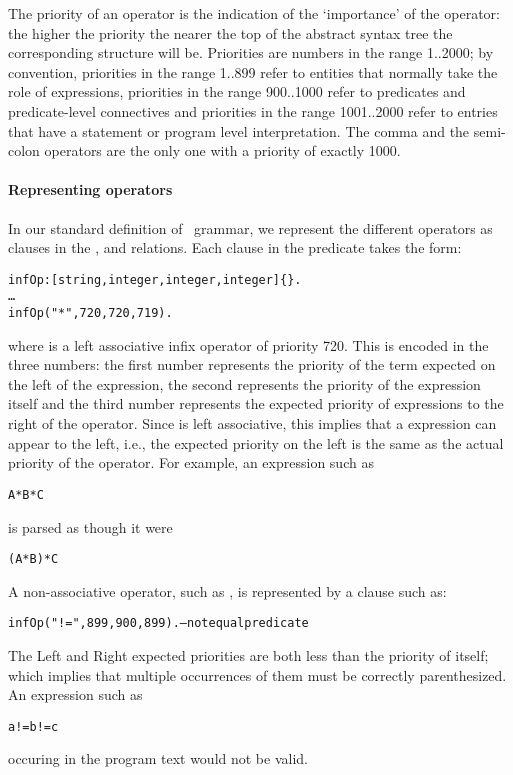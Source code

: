 The priority of an operator is the indication of the `importance' of the operator: the higher the priority the nearer the top of the abstract syntax tree the corresponding structure will be. Priorities are numbers in the range 1..2000; by convention, priorities in the range 1..899 refer to entities that normally take the role of expressions, priorities in the range 900..1000 refer to predicates and predicate-level connectives and priorities in the range 1001..2000 refer to entries that have a statement or program level interpretation. The comma and the semi-colon operators are the only one with a priority of exactly 1000.



\paragraph{Representing operators}
In our standard definition of \go\ grammar, we represent the different operators as clauses in the ,  and  relations. Each clause in the  predicate takes the form:
\begin{alltt}
infOp:[string,integer,integer,integer]\{\}.
\ldots
infOp("*",720,720,719).
\end{alltt}
where  is a left associative infix operator of priority 720. This is encoded in the three numbers: the first number represents the priority of the term expected on the left of the \function{*} expression, the second represents the priority of the \function{*} expression itself and the third number represents the expected priority of expressions to the right of the \function{*} operator. Since \function{*} is left associative, this implies that a \function{*} expression can appear to the left, i.e., the expected priority on the left is the same as the actual priority of the \function{*} operator. For example, an expression such as 
\begin{alltt}
A*B*C
\end{alltt}
is parsed as though it were
\begin{alltt}
(A*B)*C
\end{alltt}

A non-associative operator, such as \function{!=}, is represented by a clause such as:
\begin{alltt}
infOp("!=",899,900,899).		-- not equal predicate
\end{alltt}
The Left and Right expected priorities are both less than the priority of \function{!=} itself; which implies that multiple occurrences of them must be correctly parenthesized. An expression such as
\begin{alltt}
a != b != c
\end{alltt}
occuring in the program text would not be valid.

